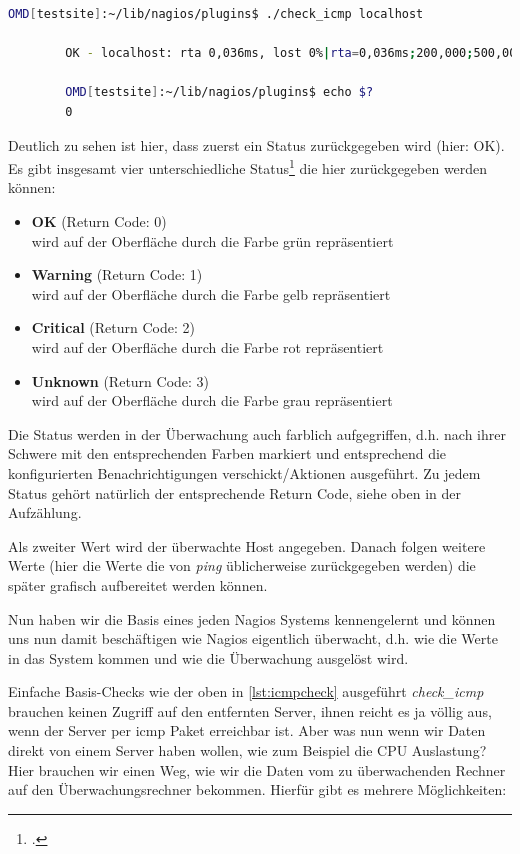 \documentclass[12pt,a4paper,parskip,listof=totoc,bibliography=totoc]{scrreprt}
\begin{document}
	\begin{lstlisting}[language=bash, caption=Rückgabe eines ICMP Checks, showlines=false, breaklines=true,numberblanklines=false, label=lst:icmpcheck]
		OMD[testsite]:~/lib/nagios/plugins$ ./check_icmp localhost
		
		OK - localhost: rta 0,036ms, lost 0%|rta=0,036ms;200,000;500,000;0; pl=0%;40;80;; rtmax=0,086ms;;;; rtmin=0,022ms;;;; 
		
		OMD[testsite]:~/lib/nagios/plugins$ echo $?
		0	\end{lstlisting}
	Deutlich zu sehen ist hier, dass zuerst ein Status zurückgegeben wird (hier: OK). Es gibt insgesamt vier unterschiedliche Status\footcite[Plugin Return Codes]{nagiospluginguidelines} die hier zurückgegeben werden können:
	\begin{itemize}
		\item \textbf{OK} (Return Code: 0)\\
		wird auf der Oberfläche durch die Farbe grün repräsentiert
		\item \textbf{Warning} (Return Code: 1)\\
		wird auf der Oberfläche durch die Farbe gelb repräsentiert
		\item \textbf{Critical} (Return Code: 2)\\
		wird auf der Oberfläche durch die Farbe rot repräsentiert
		\item \textbf{Unknown} (Return Code: 3)\\
		wird auf der Oberfläche durch die Farbe grau repräsentiert
	\end{itemize}
	Die Status werden in der Überwachung auch farblich aufgegriffen, d.h. nach ihrer Schwere mit den entsprechenden Farben markiert und entsprechend die konfigurierten Benachrichtigungen verschickt/Aktionen ausgeführt. Zu jedem Status gehört natürlich der entsprechende Return Code, siehe oben in der Aufzählung.
	
	Als zweiter Wert wird der überwachte Host angegeben. Danach folgen weitere Werte (hier die Werte die von \textit{ping} üblicherweise zurückgegeben werden) die später grafisch aufbereitet werden können.
	
	Nun haben wir die Basis eines jeden Nagios Systems kennengelernt und können uns nun damit beschäftigen wie Nagios eigentlich überwacht, d.h. wie die Werte in das System kommen und wie die Überwachung ausgelöst wird.
	
	Einfache Basis-Checks wie der oben in \ref{lst:icmpcheck} ausgeführt \textit{check\_icmp} brauchen keinen Zugriff auf den entfernten Server, ihnen reicht es ja völlig aus, wenn der Server per \acrfull{icmp} Paket erreichbar ist. Aber was nun wenn wir Daten direkt von einem Server haben wollen, wie zum Beispiel die CPU Auslastung? Hier brauchen wir einen Weg, wie wir die Daten vom zu überwachenden Rechner auf den Überwachungsrechner bekommen. Hierfür gibt es mehrere Möglichkeiten:
	
\end{document}
